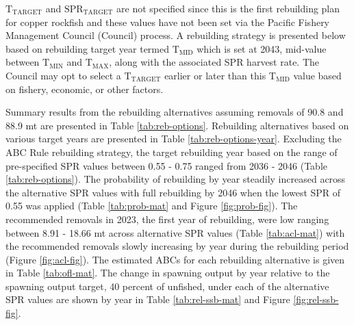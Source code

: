 \documentclass[11pt,
  english,
  a4paper,
]{article}
\begin{document}
\leavevmode\tagmcend\tagstructend


{\(\text{T}_\text{TARGET}\)\leavevmode\tagmcend\tagstructend} and {\(\text{SPR}_\text{TARGET}\)\leavevmode\tagmcend\tagstructend} are not specified since this is the first rebuilding plan for copper rockfish and these values have not been set via the Pacific Fishery Management Council (Council) process. A rebuilding strategy is presented below based on rebuilding target year termed {\(\text{T}_\text{MID}\)\leavevmode\tagmcend\tagstructend} which is set at 2043, mid-value between {\(\text{T}_\text{MIN}\)\leavevmode\tagmcend\tagstructend} and {\(\text{T}_\text{MAX}\)\leavevmode\tagmcend\tagstructend}, along with the associated SPR harvest rate. The Council may opt to select a {\(\text{T}_\text{TARGET}\)\leavevmode\tagmcend\tagstructend} earlier or later than this {\(\text{T}_\text{MID}\)\leavevmode\tagmcend\tagstructend} value based on fishery, economic, or other factors.

\leavevmode\tagmcend\tagstructend\par


Summary results from the rebuilding alternatives assuming removals of 90.8 and 88.9 mt are presented in Table \ref{tab:reb-options}. Rebuilding alternatives based on various target years are presented in Table \ref{tab:reb-options-year}. Excluding the ABC Rule rebuilding strategy, the target rebuilding year based on the range of pre-specified SPR values between 0.55 - 0.75 ranged from 2036 - 2046 (Table \ref{tab:reb-options}). The probability of rebuilding by year steadily increased across the alternative SPR values with full rebuilding by 2046 when the lowest SPR of 0.55 was applied (Table \ref{tab:prob-mat} and Figure \ref{fig:prob-fig}). The recommended removals in 2023, the first year of rebuilding, were low ranging between 8.91 - 18.66 mt across alternative SPR values (Table \ref{tab:acl-mat}) with the recommended removals slowly increasing by year during the rebuilding period (Figure \ref{fig:acl-fig}). The estimated ABCs for each rebuilding alternative is given in Table \ref{tab:ofl-mat}. The change in spawning output by year relative to the spawning output target, 40 percent of unfished, under each of the alternative SPR values are shown by year in Table \ref{tab:rel-ssb-mat} and Figure \ref{fig:rel-ssb-fig}.
\end{document}
